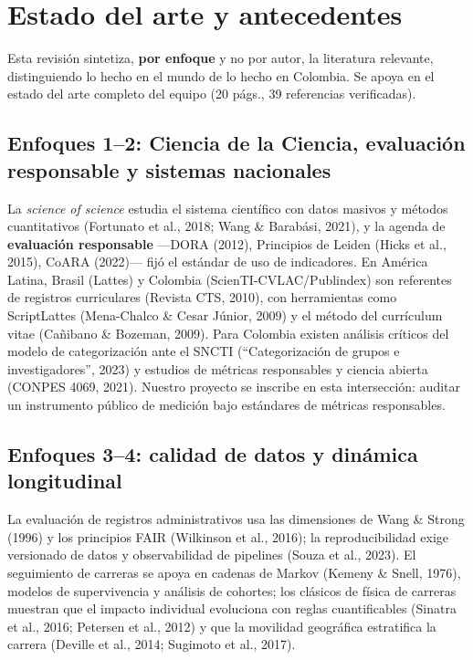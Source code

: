 \section{Estado del arte y antecedentes}

Esta revisión sintetiza, \textbf{por enfoque} y no por autor, la literatura
relevante, distinguiendo lo hecho en el mundo de lo hecho en Colombia. Se apoya
en el estado del arte completo del equipo (20 págs., 39 referencias
verificadas).

\subsection{Enfoques 1--2: Ciencia de la Ciencia, evaluación responsable y sistemas nacionales}

La \emph{science of science} estudia el sistema científico con datos masivos y
métodos cuantitativos (Fortunato et al., 2018; Wang \& Barabási, 2021), y la
agenda de \textbf{evaluación responsable} —DORA (2012), Principios de Leiden
(Hicks et al., 2015), CoARA (2022)— fijó el estándar de uso de indicadores.
En América Latina, Brasil (Lattes) y Colombia (ScienTI-CVLAC/Publindex) son
referentes de registros curriculares (Revista CTS, 2010), con herramientas
como ScriptLattes (Mena-Chalco \& Cesar Júnior, 2009) y el método del
currículum vitae (Cañibano \& Bozeman, 2009). Para Colombia existen análisis
críticos del modelo de categorización ante el SNCTI (``Categorización de
grupos e investigadores'', 2023) y estudios de
métricas responsables y ciencia abierta (CONPES 4069, 2021). Nuestro proyecto
se inscribe en esta intersección: auditar un instrumento público de medición
bajo estándares de métricas responsables.

\subsection{Enfoques 3--4: calidad de datos y dinámica longitudinal}

La evaluación de registros administrativos usa las dimensiones de Wang \&
Strong (1996) y los principios FAIR (Wilkinson et al., 2016); la
reproducibilidad exige versionado de datos y observabilidad de pipelines
(Souza et al., 2023). El seguimiento de carreras se apoya en cadenas de Markov
(Kemeny \& Snell, 1976), modelos de supervivencia y análisis de cohortes; los
clásicos de física de carreras muestran que el impacto individual evoluciona
con reglas cuantificables (Sinatra et al., 2016; Petersen et al., 2012) y que
la movilidad geográfica estratifica la carrera (Deville et al., 2014; Sugimoto
et al., 2017).

